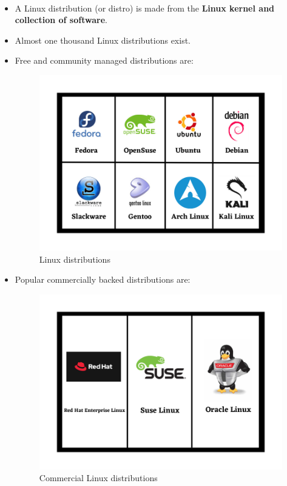 \setlength{\columnsep}{5pt}
\begin{flushleft}
	\paragraph{}
	\begin{itemize}
		\item A Linux distribution (or distro) is made from the \textbf{Linux kernel and collection of software}.
		\item Almost one thousand Linux distributions exist.
		\item Free and community managed distributions are:
		\begin{figure}[h!]
			\centering
			\includegraphics[scale=0.4]{content/chapter1/images/distro.png}
			\caption{Linux distributions}
			\label{fig:distro1}
		\end{figure}
		
		\item Popular commercially backed distributions are:
		\begin{figure}[h!]
			\centering
			\includegraphics[scale=0.3]{content/chapter1/images/distro2.png}
			\caption{Commercial Linux distributions}
			\label{fig:distro2}
		\end{figure}


\end{itemize}
\end{flushleft}
